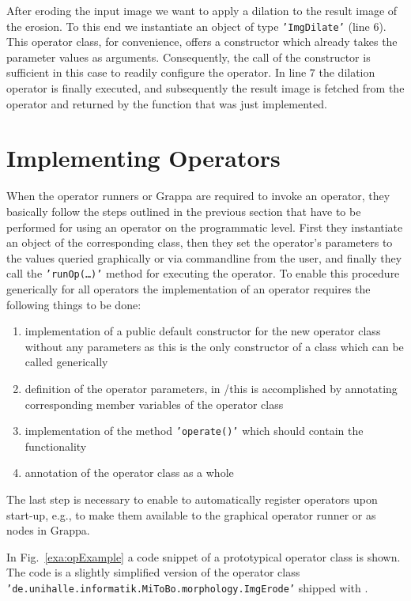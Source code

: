 After eroding the input image we want to apply a
dilation to the result image of the erosion. To this end we instantiate an object of type
{\tt 'ImgDilate'} (line $6$). This operator class, for convenience, offers a constructor which 
already takes the parameter values as arguments. Consequently, the call of the constructor is 
sufficient in this case to readily configure the operator. In line $7$ the dilation operator is 
finally executed, and subsequently the result image is fetched from the operator and returned by
the function that was just implemented.

\section{Implementing Operators}
\label{sec:makeOp}
When the \mitobo operator runners or Grappa are required to invoke an operator, they basically 
follow the steps outlined in the previous section that have to be performed for using an operator on 
the programmatic level. First they instantiate an object of the corresponding class, then they set 
the operator's parameters to the values queried graphically or via commandline from the user,
and finally they call the {\tt 'runOp(\ldots)'} method for executing the operator. To enable this
procedure generically for all operators the implementation of an operator requires the following
things to be done:
\begin{enumerate}
  \item implementation of a public default constructor for the new operator class without any 
  	parameters as this is the only constructor of a class which can be called generically
  \item definition of the operator parameters, in \alida/\mitobo this is accomplished
  	by annotating corresponding member variables of the operator class
  \item implementation of the method {\tt 'operate()'} which should contain the functionality
  \item annotation of the operator class as a whole
\end{enumerate}
The last step is necessary to enable \alida to automatically register operators upon
start-up, e.g., to make them available to the graphical operator runner or as nodes in Grappa.

In Fig.~\ref{exa:opExample} a code snippet of a prototypical operator class is shown. The code 
is a slightly simplified version of the operator class 
{\tt 'de.unihalle.informa\-tik.MiToBo.morpholo\-gy.ImgErode'} shipped with \mitobo.

